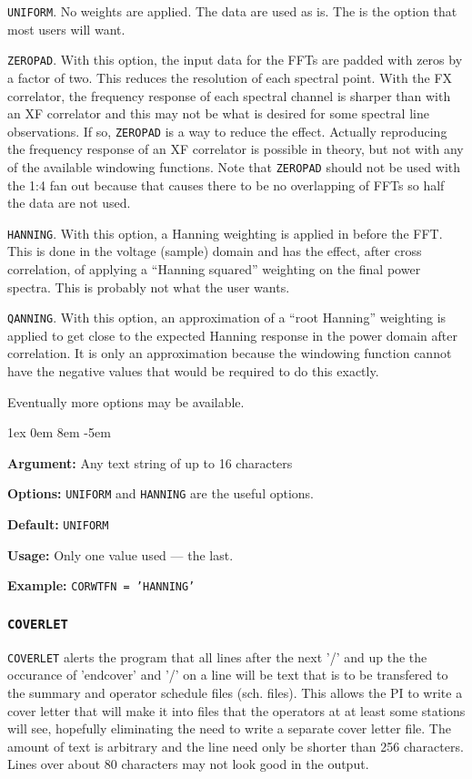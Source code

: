 \documentclass{report}
\newcommand{\rcwbox}[5]{
  \begin{list}{}{\parsep 1ex  \itemsep 0em
                 \leftmargin 8em  \itemindent -5em }
    \item {\bf Argument:} #1
    \item {\bf Options:}  #2
    \item {\bf Default:}  #3
    \item {\bf Usage:}    #4
    \item {\bf Example:}  #5
  \end{list}
}
\begin{document}
\begin{list}{}{\parsep 0em  \itemsep 0em }

\item {\tt UNIFORM}.  No weights are applied.  The data are used
as is.  The is the option that most users will want.

\item {\tt ZEROPAD}.  With this option, the input data for the
FFTs are padded with zeros by a factor of two.  This reduces the
resolution of each spectral point.  With the FX correlator, the
frequency response of each spectral channel is sharper than with
an XF correlator and this may not be what is desired for some
spectral line observations.  If so, {\tt ZEROPAD} is a way to
reduce the effect.  Actually reproducing the frequency response
of an XF correlator is possible in theory, but not with any
of the available windowing functions.  Note that {\tt ZEROPAD}
should not be used with the 1:4 fan out because that causes
there to be no overlapping of FFTs so half the data are not used.

\item {\tt HANNING}.  With this option, a Hanning weighting is
applied in before the FFT.  This is done in the voltage (sample)
domain and has the effect, after cross correlation, of applying
a ``Hanning squared'' weighting on the final power spectra.  This
is probably not what the user wants.

\item {\tt QANNING}.  With this option, an approximation of a
``root Hanning'' weighting is applied to get close to the expected
Hanning response in the power domain after correlation.  It is
only an approximation because the windowing function cannot have
the negative values that would be required to do this exactly.

\end{list}

Eventually more options may be available.

\rcwbox
{Any text string of up to 16 characters}
{{\tt UNIFORM} and {\tt HANNING} are the useful options.}
{{\tt UNIFORM}}
{Only one value used --- the last.}
{{\tt CORWTFN = 'HANNING'}}

\subsubsection{\label{MP:COVERLET}{\tt COVERLET}}

{\tt COVERLET} alerts the program that all lines after the next '/'
and up the the occurance of 'endcover' and '/' on a line will be text
that is to be transfered to the summary and operator schedule files
(sch. files).  This allows the PI to write a cover letter that will
make it into files that the operators at at least some stations will
see, hopefully eliminating the need to write a separate cover letter
file.  The amount of text is arbitrary and the line need only be
shorter than 256 characters.  Lines over about 80 characters may not
look good in the output.
\end{document}
